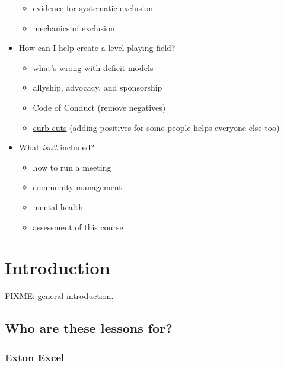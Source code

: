 \documentclass[]{Nemilov}
\providecommand{\tightlist}{%
  \setlength{\itemsep}{0pt}\setlength{\parskip}{0pt}}
\begin{document}
\begin{itemize}
  \begin{itemize}
  \tightlist
  \item
    evidence for systematic exclusion
  \item
    mechanics of exclusion
  \end{itemize}
\item
  How can I help create a level playing field?

  \begin{itemize}
  \tightlist
  \item
    what's wrong with deficit models
  \item
    allyship, advocacy, and sponsorship
  \item
    Code of Conduct (remove negatives)
  \item
    \href{glossary.html\#curb-cuts}{curb cuts} (adding positives for some people helps everyone else too)
  \end{itemize}
\item
  What \emph{isn't} included?

  \begin{itemize}
  \tightlist
  \item
    how to run a meeting
  \item
    community management
  \item
    mental health
  \item
    assessment of this course
  \end{itemize}
\end{itemize}

\hypertarget{r-intro}{%
\chapter{Introduction}\label{r-intro}}

FIXME: general introduction.

\hypertarget{r-intro-personas}{%
\section{Who are these lessons for?}\label{r-intro-personas}}

\hypertarget{exton-excel}{%
\subsection{Exton Excel}\label{exton-excel}}
\end{document}
